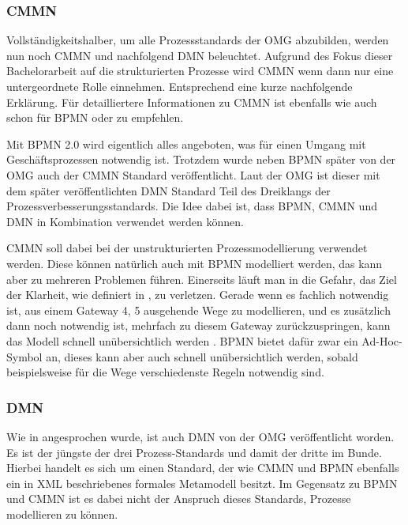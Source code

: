 \subsubsection{\acl{CMMN}}

Vollständigkeitshalber, um alle Prozessstandards der \ac{OMG} abzubilden, werden nun noch \ac{CMMN} und nachfolgend \acs{DMN} beleuchtet. Aufgrund des Fokus dieser Bachelorarbeit auf die strukturierten Prozesse wird \ac{CMMN} wenn dann nur eine untergeordnete Rolle einnehmen. Entsprechend eine kurze nachfolgende Erklärung. Für detailliertere Informationen zu \ac{CMMN} ist ebenfalls wie auch schon für \ac{BPMN} \cite{freund_praxishandbuch_2017} oder \cite{bruce_cmmn_2020} zu empfehlen.

\label{par:dreiklang_prozessverbesserungsstandards}
Mit \ac{BPMN} 2.0 wird eigentlich alles angeboten, was für einen Umgang mit Geschäftsprozessen notwendig ist. Trotzdem wurde neben \ac{BPMN} später von der \ac{OMG} auch der \ac{CMMN} Standard veröffentlicht. Laut der \ac{OMG} ist dieser mit dem später veröffentlichten \ac{DMN} Standard Teil des Dreiklangs der Prozessverbesserungsstandards. Die Idee dabei ist, dass \ac{BPMN}, \ac{CMMN} und \ac{DMN} in Kombination verwendet werden können. \citep[vgl.][]{object_management_group_case_2016}

\ac{CMMN} soll dabei bei der unstrukturierten Prozessmodellierung verwendet werden. Diese können natürlich auch mit \ac{BPMN} modelliert werden, das kann aber zu mehreren Problemen führen. Einerseits läuft man in die Gefahr, das Ziel der Klarheit, wie definiert in , zu verletzen. Gerade wenn es fachlich notwendig ist, aus einem Gateway 4, 5 ausgehende Wege zu modellieren, und es zusätzlich dann noch notwendig ist, mehrfach zu diesem Gateway zurückzuspringen, kann das Modell schnell unübersichtlich werden \citep[vgl.][S. 9]{freund_praxishandbuch_2017}. \ac{BPMN} bietet dafür zwar ein Ad-Hoc-Symbol an, dieses kann aber auch schnell unübersichtlich werden, sobald beispielsweise für die Wege verschiedenste Regeln notwendig sind. 

\subsubsection{\acl{DMN}}

Wie in  angesprochen wurde, ist auch \acl{DMN} von der \ac{OMG} veröffentlicht worden. Es ist der jüngste der drei Prozess-Standards und damit der dritte im Bunde. Hierbei handelt es sich um einen Standard, der wie \ac{CMMN} und \ac{BPMN} ebenfalls ein in XML beschriebenes formales Metamodell besitzt. Im Gegensatz zu \ac{BPMN} und \ac{CMMN} ist es dabei nicht der Anspruch dieses Standards, Prozesse modellieren zu können. \citep[vgl.][S. 10f]{freund_praxishandbuch_2017} 

